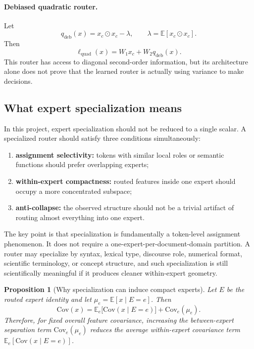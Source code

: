 \documentclass[11pt]{article}
\newtheorem{proposition}{Proposition}
\begin{document}
\paragraph{Debiased quadratic router.}
Let
\[
q_{\mathrm{deb}}(x)=x_c \odot x_c - \lambda,
\qquad
\lambda = \mathbb{E}[x_c \odot x_c].
\]
Then
\[
\ell_{\mathrm{quad}}(x)=W_1 x_c + W_2 q_{\mathrm{deb}}(x).
\]
This router has access to diagonal second-order information, but its architecture alone does not prove that the learned router is actually using variance to make decisions.

\subsection{What expert specialization means}

In this project, expert specialization should not be reduced to a single scalar. A specialized router should satisfy three conditions simultaneously:
\begin{enumerate}
    \item \textbf{assignment selectivity:} tokens with similar local roles or semantic functions should prefer overlapping experts;
    \item \textbf{within-expert compactness:} routed features inside one expert should occupy a more concentrated subspace;
    \item \textbf{anti-collapse:} the observed structure should not be a trivial artifact of routing almost everything into one expert.
\end{enumerate}

The key point is that specialization is fundamentally a token-level assignment phenomenon. It does not require a one-expert-per-document-domain partition. A router may specialize by syntax, lexical type, discourse role, numerical format, scientific terminology, or concept structure, and such specialization is still scientifically meaningful if it produces cleaner within-expert geometry.

\begin{proposition}[Why specialization can induce compact experts]
Let $E$ be the routed expert identity and let $\mu_e=\mathbb{E}[x\mid E=e]$. Then
\[
\mathrm{Cov}(x)
=
\mathbb{E}_{e}\!\big[\mathrm{Cov}(x\mid E=e)\big]
+
\mathrm{Cov}_{e}(\mu_e).
\]
Therefore, for fixed overall feature covariance, increasing the between-expert separation term $\mathrm{Cov}_{e}(\mu_e)$ reduces the average within-expert covariance term $\mathbb{E}_{e}[\mathrm{Cov}(x\mid E=e)]$.
\end{proposition}
\end{document}
